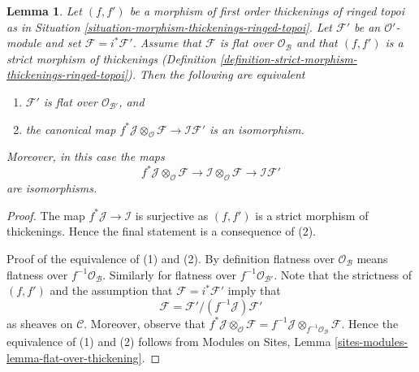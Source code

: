 \documentclass[10pt,a4paper]{amsart}
\theoremstyle{plain}
\newtheorem{lemma}[subsection]{Lemma}
\theoremstyle{definition}
\theoremstyle{remark}
\numberwithin{equation}{subsection}
\begin{document}
\begin{lemma}
\label{lemma-deform-module-ringed-topoi}
Let $(f, f')$ be a morphism of first order thickenings of ringed topoi
as in Situation \ref{situation-morphism-thickenings-ringed-topoi}.
Let $\mathcal{F}'$ be an $\mathcal{O}'$-module
and set $\mathcal{F} = i^*\mathcal{F}'$.
Assume that $\mathcal{F}$ is flat over $\mathcal{O}_\mathcal{B}$
and that $(f, f')$ is a strict morphism of thickenings
(Definition \ref{definition-strict-morphism-thickenings-ringed-topoi}).
Then the following are equivalent
\begin{enumerate}
\item $\mathcal{F}'$ is flat over $\mathcal{O}_{\mathcal{B}'}$, and
\item the canonical map
$f^*\mathcal{J} \otimes_\mathcal{O} \mathcal{F} \to
\mathcal{I}\mathcal{F}'$
is an isomorphism.
\end{enumerate}
Moreover, in this case the maps
$$
f^*\mathcal{J} \otimes_\mathcal{O} \mathcal{F} \to
\mathcal{I} \otimes_\mathcal{O} \mathcal{F} \to
\mathcal{I}\mathcal{F}'
$$
are isomorphisms.
\end{lemma}

\begin{proof}
The map $f^*\mathcal{J} \to \mathcal{I}$ is surjective
as $(f, f')$ is a strict morphism of thickenings.
Hence the final statement is a consequence of (2).

\medskip\noindent
Proof of the equivalence of (1) and (2). By definition flatness over
$\mathcal{O}_\mathcal{B}$ means flatness over $f^{-1}\mathcal{O}_\mathcal{B}$.
Similarly for flatness over $f^{-1}\mathcal{O}_{\mathcal{B}'}$.
Note that the strictness of $(f, f')$ and the assumption that
$\mathcal{F} = i^*\mathcal{F}'$ imply that
$$
\mathcal{F} = \mathcal{F}'/(f^{-1}\mathcal{J})\mathcal{F}'
$$
as sheaves on $\mathcal{C}$. Moreover, observe that
$f^*\mathcal{J} \otimes_\mathcal{O} \mathcal{F} =
f^{-1}\mathcal{J} \otimes_{f^{-1}\mathcal{O}_\mathcal{B}} \mathcal{F}$.
Hence the equivalence of (1) and (2) follows from
Modules on Sites, Lemma \ref{sites-modules-lemma-flat-over-thickening}.
\end{proof}
\end{document}

